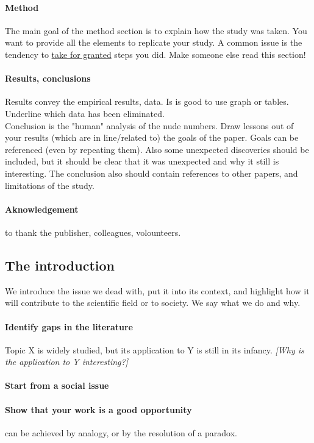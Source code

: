 \documentclass{article}
\begin{document}
\paragraph{Method} The main goal of the method section is to explain how the study was taken. You want to provide all the elements to replicate your study. A common issue is the tendency to \underline{take for granted} steps you did. Make someone else read this section!
\paragraph{Results, conclusions} Results convey the empirical results, data. Is is good to use graph or tables. Underline which data has been eliminated.\\ 
Conclusion is the "human" analysis of the nude numbers. Draw lessons out of your results (which are in line/related to) the goals of the paper. Goals can be referenced (even by repeating them). Also some unexpected discoveries should be included, but it should be clear that it was unexpected and why it still is interesting. The conclusion also should contain references to other papers, and limitations of the study.
\paragraph{Aknowledgement} to thank the publisher, colleagues, volounteers.

\subsection{The introduction}
We introduce the issue we dead with, put it into its context, and highlight how it will contribute to the scientific field or to society. We say what we do and why.
\paragraph{Identify gaps in the literature} Topic X is widely studied, but its application to Y is still in its infancy. \textit{[Why is the application to Y interesting?]}
\paragraph{Start from a social issue}
\paragraph{Show that your work is a good opportunity} can be achieved by analogy, or by the resolution of a paradox.
\end{document}
